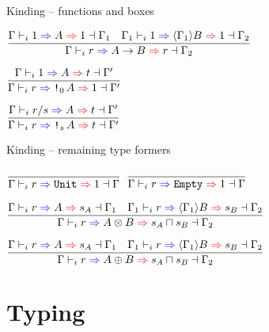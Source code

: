 \documentclass{beamer}
\begin{document}
\begin{frame}{Kinding -- functions and boxes}

\begin{center}
  $\infrule{\newkinding{\Gamma}{\One}{A}{\One}{\Gamma_1} \quad \newkinding{\Gamma_1}{\One}{\substctx{\Gamma_1}{B}}{\One}{\Gamma_2}}{\newkinding{\Gamma}{r}{\Fun{A}{B}}{r}{\Gamma_2}}$

  \vspace{2em}

  $\infrule{\newkinding{\Gamma}{\One}{A}{t}{\Gamma'}}{\newkinding{\Gamma}{r}{\Box[\Zero]{A}}{\One}{\Gamma'}}$

  \vspace{2em}

  $\infrule{\newkinding{\Gamma}{\divqty{r}{s}}{A}{t}{\Gamma'}}{\newkinding{\Gamma}{r}{\Box[s]{A}}{t}{\Gamma'}}$
\end{center}

\end{frame}

\begin{frame}{Kinding -- remaining type formers}

\begin{center}
  $\infrule{}{\newkinding{\Gamma}{r}{\Unit}{\One}{\Gamma}}$ \quad
  $\infrule{}{\newkinding{\Gamma}{r}{\Empty}{\One}{\Gamma}}$
  
  \vspace{2em}

  $\infrule{\newkinding{\Gamma}{r}{A}{s_A}{\Gamma_1} \quad \newkinding{\Gamma_1}{r}{\substctx{\Gamma_1}{B}}{s_B}{\Gamma_2}}{\newkinding{\Gamma}{r}{\Prod{A}{B}}{\glbqty{s_A}{s_B}}{\Gamma_2}}$
  
  \vspace{2em}

  $\infrule{\newkinding{\Gamma}{r}{A}{s_A}{\Gamma_1} \quad \newkinding{\Gamma_1}{r}{\substctx{\Gamma_1}{B}}{s_B}{\Gamma_2}}{\newkinding{\Gamma}{r}{\Sum{A}{B}}{\glbqty{s_A}{s_B}}{\Gamma_2}}$
\end{center}

\end{frame}

\section{Typing}
\end{document}
